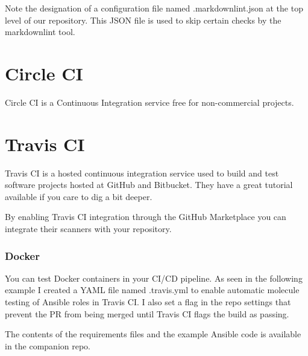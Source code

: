 %	

\justifying
Note the designation of a configuration file named .markdownlint.json at
the top level of our repository. This JSON file is used to skip certain
checks by the markdownlint tool.

%	

\section{Circle CI}
\justifying
Circle CI is a Continuous Integration service free for non-commercial
projects.

%	

\section{Travis CI}

\justifying
Travis CI is a hosted continuous integration service used to build and
test software projects hosted at GitHub and Bitbucket. They have a great
tutorial available if you care to dig a bit deeper.

\justifying
By enabling Travis CI integration through the GitHub Marketplace you
can integrate their scanners with your repository.

\subsubsection{Docker}

\justifying
You can test Docker containers in your CI/CD pipeline. As seen in the
following example I created a YAML file named .travis.yml to enable
automatic molecule testing of Ansible roles in Travis CI. I also set a
flag in the repo settings that prevent the PR from being merged until
Travis CI flags the build as passing.

%	
\justifying
The contents of the requirements files and the example Ansible code is
available in the companion repo.


